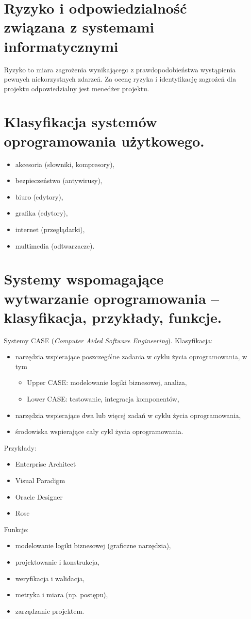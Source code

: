 \documentclass[12pt,a4paper]{article}
\begin{document}
	\section{Ryzyko i odpowiedzialność związana z systemami informatycznymi}
	Ryzyko to miara zagrożenia wynikającego z prawdopodobieństwa wystąpienia pewnych niekorzystnych zdarzeń. Za ocenę ryzyka i identyfikację zagrożeń dla projektu odpowiedzialny jest menedżer projektu.

	\section{Klasyfikacja systemów oprogramowania użytkowego.}
	\begin{itemize}
		\item akcesoria (słowniki, kompresory),
		\item bezpieczeństwo (antywirusy),
		\item biuro (edytory),
		\item grafika (edytory),
		\item internet (przeglądarki),
		\item multimedia (odtwarzacze).
	\end{itemize}

	\section{Systemy wspomagające wytwarzanie oprogramowania – klasyfikacja, przykłady, funkcje.}
	Systemy CASE (\textit{Computer Aided Software Engineering}). Klasyfikacja:
	\begin{itemize}
		\item narzędzia wspierające poszczególne zadania w cyklu życia oprogramowania, w tym
		\begin{itemize}
			\item Upper CASE: modelowanie logiki biznesowej, analiza,
			\item Lower CASE: testowanie, integracja komponentów,
		\end{itemize}
		\item narzędzia wspierające dwa lub więcej zadań w cyklu życia oprogramowania,
		\item środowiska wspierające cały cykl życia oprogramowania.
	\end{itemize}
	Przykłady:
	\begin{itemize}
		\item Enterprise Architect
		\item Visual Paradigm
		\item Oracle Designer
		\item Rose
	\end{itemize}
	Funkcje:
	\begin{itemize}
		\item modelowanie logiki biznesowej (graficzne narzędzia),
		\item projektowanie i konstrukcja,
		\item weryfikacja i walidacja,
		\item metryka i miara (np. postępu),
		\item zarządzanie projektem.
	\end{itemize}
\end{document}
